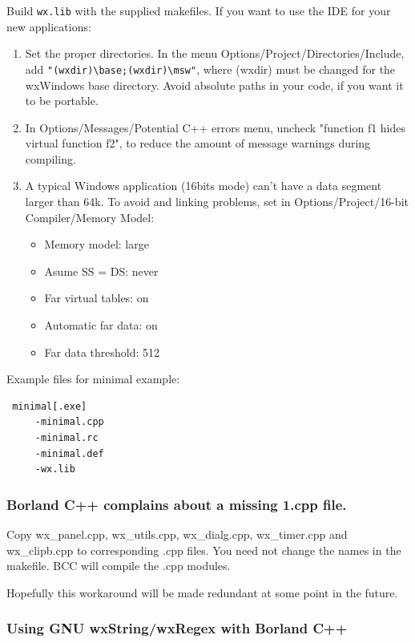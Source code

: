 Build \verb$wx.lib$ with the supplied makefiles. If you want to use the IDE
for your new applications:

\begin{enumerate}
\item Set the proper directories. In the menu Options/Project/Directories/Include,
add \verb$"(wxdir)\base;(wxdir)\msw"$, where (wxdir) must be
changed for the wxWindows base directory. Avoid absolute paths 
in your code, if you want it to be portable. 
\item In Options/Messages/Potential C++ errors menu, uncheck
"function f1 hides virtual function f2", to reduce
the amount of message warnings during compiling.
\item A typical Windows application (16bits mode) can't have a data segment
larger than 64k. To avoid 
\rtfsp{} and linking problems,
set in Options/Project/16-bit Compiler/Memory Model:
\begin{itemize}
\item Memory model: large
\item Asume SS = DS: never
\item Far virtual tables: on
\item Automatic far data: on
\item Far data threshold: 512
\end{itemize}
\end{enumerate}

Example files for minimal example:

\begin{verbatim}
 minimal[.exe]
     -minimal.cpp
     -minimal.rc
     -minimal.def
     -wx.lib
\end{verbatim}

\subsubsection{Borland C++ complains about a missing 1.cpp file.}

Copy wx\_panel.cpp, wx\_utils.cpp, wx\_dialg.cpp, wx\_timer.cpp and
wx\_clipb.cpp to corresponding .cpp files. You need not change the
names in the makefile. BCC will compile the .cpp modules.

Hopefully this workaround will be made redundant at some point
in the future.

\subsubsection{Using GNU wxString/wxRegex with Borland C++}

